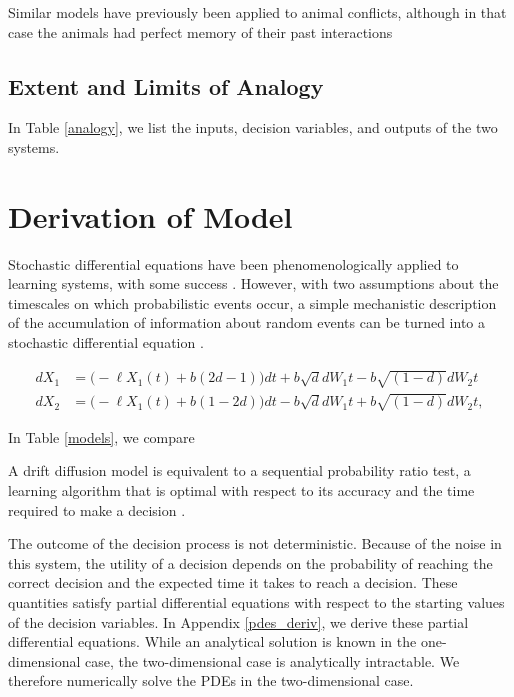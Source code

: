 \documentclass{article}
\begin{document}
Similar models have previously been applied to animal conflicts, although in that case the animals had perfect memory of their past interactions \citep{Froment:2010fk}

\subsection{Extent and Limits of Analogy }

In Table \ref{analogy}, we list the inputs, decision variables, and outputs of the two systems.  

\section{Derivation of Model \label{derivation}}
Stochastic differential equations have been phenomenologically applied to learning systems, with some success \citep{Eckhoff:2008uq, Brown:2005fk,Feng:2009kl,Bogacz:2006uq}.  However, with two assumptions about the timescales on which probabilistic events occur, a simple mechanistic description of the accumulation of information about random events can be turned into a stochastic differential equation \cite{Gillespie:2000fk}.  

\begin{equation}
\begin{array}{ll}
dX_1&=\bigg(-\ell X_1(t)+b(2d-1)\bigg)dt+b\sqrt{d}dW_{1}t-b\sqrt{(1-d)}dW_{2}t
\\dX_2&=\bigg(-\ell X_1(t)+b(1-2d)\bigg)dt-b\sqrt{d}dW_{1}t+b\sqrt{(1-d)}dW_{2}t,
\end{array}
\end{equation}

In Table \ref{models}, we compare 

A drift diffusion model is equivalent to a sequential probability ratio test, a learning algorithm that is optimal with respect to its accuracy and the time required to make a decision \cite{Moehlis:2004fk,Bogacz:2006uq}.  

The outcome of the decision process is not deterministic. Because of the noise in this system, the utility of a decision depends on the probability of reaching the correct decision and the expected time it takes to reach a decision.  These quantities satisfy partial differential equations with respect to the starting values of the decision variables. In Appendix \ref{pdes_deriv}, we derive these partial differential equations.  While an analytical solution is known in the one-dimensional case, the two-dimensional case is analytically intractable.  We therefore numerically solve the PDEs in the two-dimensional case.
\end{document}
